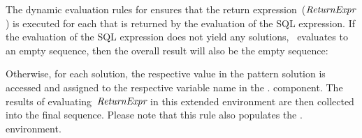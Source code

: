 The dynamic evaluation rules for  ensures that the return expression~(${\textit{ReturnExpr}}$) is
executed for each  that is returned by the evaluation of the \ac{SQL} expression.
%
If the evaluation of the SQL expression does not yield any solutions, \ie~evaluates to an empty sequence, then the
overall result will also be the empty sequence:
%
\begin{dynamicrule}
  \singleLine
\end{dynamicrule}%
%
Otherwise, for each solution, the respective value in the pattern solution is accessed and assigned to the respective
variable name in the \dyn. component.  The results of evaluating~${\textit{ReturnExpr}}$ in this
extended environment are then collected into the final sequence.  Please note that this rule also populates the
\dyn. environment.
%
